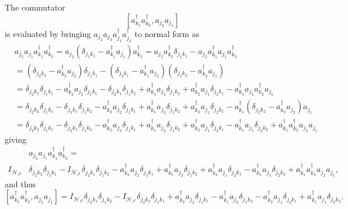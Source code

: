 \documentclass[aps,preprint]{revtex4}%
\begin{document}
The commutator%
\begin{equation}
\left[  a_{k_{1}}^{\dagger}a_{k_{2}}^{\dagger},a_{j_{2}}a_{j_{1}}\right]
\end{equation}
is evaluated by bringing $a_{j_{4}}a_{j_{3}}a_{j_{1}}^{\dagger}a_{j_{2}%
}^{\dagger}$ to normal form as%
\begin{align}
&  a_{j_{2}}a_{j_{1}}a_{k_{1}}^{\dagger}a_{k_{2}}^{\dagger}=a_{j_{2}}\left(
\delta_{j_{1}k_{1}}-a_{k_{1}}^{\dagger}a_{j_{1}}\right)  a_{k_{2}}^{\dagger
}=a_{j_{2}}a_{k_{2}}^{\dagger}\delta_{j_{1}k_{1}}-a_{j_{2}}a_{k_{1}}^{\dagger
}a_{j_{1}}a_{k_{2}}^{\dagger}\nonumber\\
&  =\left(  \delta_{j_{2}k_{2}}-a_{k_{2}}^{\dagger}a_{j_{2}}\right)
\delta_{j_{1}k_{1}}-\left(  \delta_{j_{2}k_{1}}-a_{k_{1}}^{\dagger}a_{j_{2}%
}\right)  \left(  \delta_{j_{1}k_{2}}-a_{k_{2}}^{\dagger}a_{j_{1}}\right)
\nonumber\\
&  =\delta_{j_{2}k_{2}}\delta_{j_{1}k_{1}}-a_{k_{2}}^{\dagger}a_{j_{2}}%
\delta_{j_{1}k_{1}}-\delta_{j_{2}k_{1}}\delta_{j_{1}k_{2}}+a_{k_{1}}^{\dagger
}a_{j_{2}}\delta_{j_{1}k_{2}}+a_{k_{2}}^{\dagger}a_{j_{1}}\delta_{j_{2}k_{1}%
}-a_{k_{1}}^{\dagger}a_{j_{2}}a_{k_{2}}^{\dagger}a_{j_{1}}\nonumber\\
&  =\delta_{j_{2}k_{2}}\delta_{j_{1}k_{1}}-\delta_{j_{2}k_{1}}\delta
_{j_{1}k_{2}}-a_{k_{2}}^{\dagger}a_{j_{2}}\delta_{j_{1}k_{1}}+a_{k_{1}%
}^{\dagger}a_{j_{2}}\delta_{j_{1}k_{2}}+a_{k_{2}}^{\dagger}a_{j_{1}}%
\delta_{j_{2}k_{1}}-a_{k_{1}}^{\dagger}\left(  \delta_{j_{2}k_{2}}-a_{k_{2}%
}^{\dagger}a_{j_{2}}\right)  a_{j_{1}}\nonumber\\
&  =\delta_{j_{2}k_{2}}\delta_{j_{1}k_{1}}-\delta_{j_{2}k_{1}}\delta
_{j_{1}k_{2}}-a_{k_{2}}^{\dagger}a_{j_{2}}\delta_{j_{1}k_{1}}+a_{k_{1}%
}^{\dagger}a_{j_{2}}\delta_{j_{1}k_{2}}+a_{k_{2}}^{\dagger}a_{j_{1}}%
\delta_{j_{2}k_{1}}-a_{k_{1}}^{\dagger}a_{j_{1}}\delta_{j_{2}k_{2}}+a_{k_{1}%
}^{\dagger}a_{k_{2}}^{\dagger}a_{j_{2}}a_{j_{1}}%
\end{align}
giving
\begin{align}
&  a_{j_{2}}a_{j_{1}}a_{k_{1}}^{\dagger}a_{k_{2}}^{\dagger}=\nonumber\\
I_{\mathcal{H}_{\mathcal{F}}}  &  \delta_{j_{2}k_{2}}\delta_{j_{1}k_{1}%
}-I_{\mathcal{H}_{\mathcal{F}}}\delta_{j_{2}k_{1}}\delta_{j_{1}k_{2}}%
-a_{k_{2}}^{\dagger}a_{j_{2}}\delta_{j_{1}k_{1}}+a_{k_{1}}^{\dagger}a_{j_{2}%
}\delta_{j_{1}k_{2}}+a_{k_{2}}^{\dagger}a_{j_{1}}\delta_{j_{2}k_{1}}-a_{k_{1}%
}^{\dagger}a_{j_{1}}\delta_{j_{2}k_{2}}+a_{k_{1}}^{\dagger}a_{k_{2}}^{\dagger
}a_{j_{2}}a_{j_{1}},
\end{align}
and thus
\begin{equation}
\left[  a_{k_{1}}^{\dagger}a_{k_{2}}^{\dagger},a_{j_{2}}a_{j_{1}}\right]
=I_{\mathcal{H}_{\mathcal{F}}}\delta_{j_{2}k_{1}}\delta_{j_{1}k_{2}%
}-I_{\mathcal{H}_{\mathcal{F}}}\delta_{j_{2}k_{2}}\delta_{j_{1}k_{1}}%
+a_{k_{2}}^{\dagger}a_{j_{2}}\delta_{j_{1}k_{1}}-a_{k_{1}}^{\dagger}a_{j_{2}%
}\delta_{j_{1}k_{2}}-a_{k_{2}}^{\dagger}a_{j_{1}}\delta_{j_{2}k_{1}}+a_{k_{1}%
}^{\dagger}a_{j_{1}}\delta_{j_{2}k_{2}}.
\end{equation}
\end{document}
